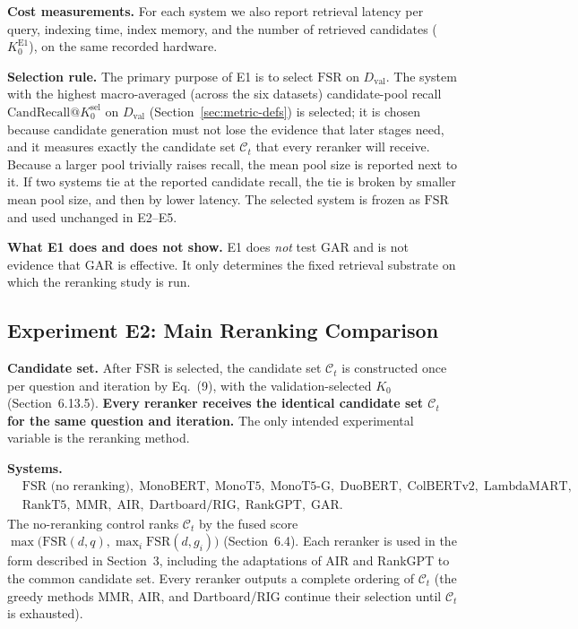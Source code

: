 \documentclass[11pt,a4paper]{article}
\begin{document}
\textbf{Cost measurements.} For each system we also report retrieval latency per query, indexing time, index memory, and the number of retrieved candidates ($K_0^{\mathrm{E1}}$), on the same recorded hardware.

\textbf{Selection rule.} The primary purpose of E1 is to select $\mathrm{FSR}$ on $D_{\mathrm{val}}$. The system with the highest macro-averaged (across the six datasets) candidate-pool recall $\mathrm{CandRecall}@K_0^{\mathrm{sel}}$ on $D_{\mathrm{val}}$ (Section~\ref{sec:metric-defs}) is selected; it is chosen because candidate generation must not lose the evidence that later stages need, and it measures exactly the candidate set $\mathcal{C}_t$ that every reranker will receive. Because a larger pool trivially raises recall, the mean pool size is reported next to it. If two systems tie at the reported candidate recall, the tie is broken by smaller mean pool size, and then by lower latency. The selected system is frozen as $\mathrm{FSR}$ and used unchanged in E2--E5.

\textbf{What E1 does and does not show.} E1 does \emph{not} test GAR and is not evidence that GAR is effective. It only determines the fixed retrieval substrate on which the reranking study is run.

\subsection{Experiment E2: Main Reranking Comparison}
\label{sec:e2}

\textbf{Candidate set.} After $\mathrm{FSR}$ is selected, the candidate set $\mathcal{C}_t$ is constructed once per question and iteration by Eq.~(9), with the validation-selected $K_0$ (Section~6.13.5). \textbf{Every reranker receives the identical candidate set $\mathcal{C}_t$ for the same question and iteration.} The only intended experimental variable is the reranking method.

\textbf{Systems.}
\[
\begin{aligned}
&\text{FSR (no reranking)},\; \text{MonoBERT},\; \text{MonoT5},\; \text{MonoT5-G},\; \text{DuoBERT},\; \text{ColBERTv2},\; \text{LambdaMART},\\
&\text{RankT5},\; \text{MMR},\; \text{AIR},\; \text{Dartboard/RIG},\; \text{RankGPT},\; \text{GAR}.
\end{aligned}
\]
The no-reranking control ranks $\mathcal{C}_t$ by the fused score $\max\big(\mathrm{FSR}(d,q),\max_i \mathrm{FSR}(d,g_i)\big)$ (Section~6.4). Each reranker is used in the form described in Section~3, including the adaptations of AIR and RankGPT to the common candidate set. Every reranker outputs a complete ordering of $\mathcal{C}_t$ (the greedy methods MMR, AIR, and Dartboard/RIG continue their selection until $\mathcal{C}_t$ is exhausted).
\end{document}
